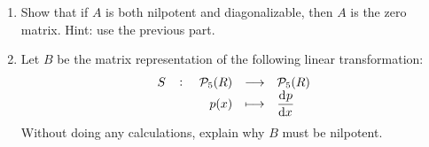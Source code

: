 \documentclass{amsart} %
\theoremstyle{mytheoremstyle}
\theoremstyle{definition}
\DeclareMathOperator{\1}{\mathbbm{1}}
\newcommand{\polyn}[2]{\mathcal{P}_{#1}(#2)}
\begin{document}
\begin{enumerate}[itemsep=1em]
\begin{enumerate}
		\item Show that if $A$ is both nilpotent and diagonalizable, then $A$ is the zero matrix. Hint: use the previous part.
		
		\item Let $B$ be the matrix representation of the following linear transformation:
		\begin{align*}
		\fullfunction{S}{\polyn{5}{R}}{\polyn{5}{R}}{p(x)}{\dod{p}{x}}
		\end{align*}
		Without doing any calculations, explain why $B$ must be nilpotent.
	\end{enumerate}

\end{enumerate}


	
\end{document}
